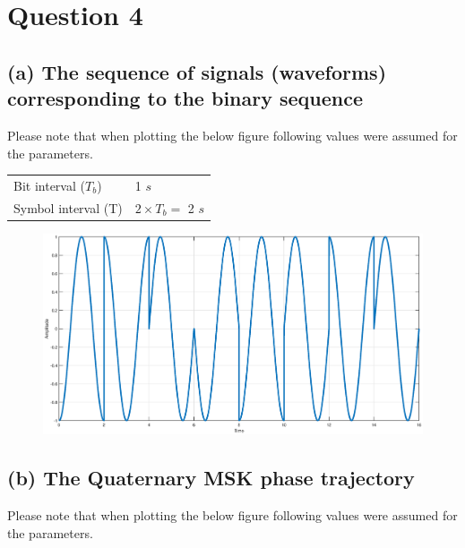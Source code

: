 \documentclass[a4paper,11pt]{article}%
\begin{document}





\pagebreak




\section*{Question 4}
\subsection*{(a) The sequence of signals (waveforms) corresponding to the binary sequence}

Please note that when plotting the below figure following values were assumed for the parameters.\\

\begin{tabular}{l l}
	Bit interval ($T_b$) & 1 $s$ \\
	Symbol interval  (T) &$2 \times T_b = $  2 $s$
\end{tabular}

\begin{figure}[!h]
	\centering
	\includegraphics[scale=0.35]{figures/fig4a}
\end{figure}



\pagebreak
\subsection*{(b) The Quaternary MSK phase trajectory}
Please note that when plotting the below figure following values were assumed for the parameters.\\
\end{document}
